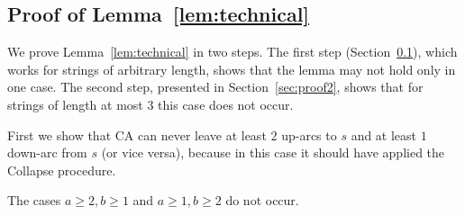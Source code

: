\subsection{Proof of Lemma~\ref{lem:technical}}
\label{sec:proof1}
We prove Lemma~\ref{lem:technical} in two steps. The first step (Section~\ref{sec:proof1}), which works for strings of arbitrary length, shows that the lemma may not hold only in one case. The second step, presented in Section~\ref{sec:proof2}, shows that for strings of length at most $3$ this case does not occur.

First we show that CA can never leave at least $2$ up-arcs to $s$ and at least $1$ down-arc from $s$ (or vice versa), because in this case it should have applied the Collapse procedure.
\begin{lemma}
\label{lem:edgecases}
The cases $a \ge 2, b \ge 1$ and $a \ge 1, b \ge 2$ do not occur.
\end{lemma}

